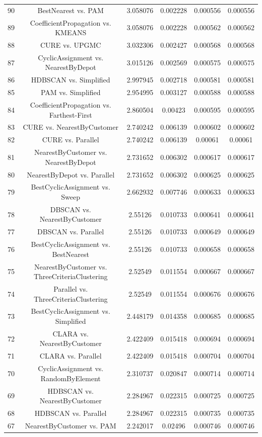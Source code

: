 \documentclass[a4paper,10pt]{article}
\begin{document}
\begin{landscape}
\begin{table}[!htp]
\begin{tabular}{cccccc}
90&BestNearest vs. PAM&3.058076&0.002228&0.000556&0.000556\\
89&CoefficientPropagation vs. KMEANS&3.058076&0.002228&0.000562&0.000562\\
88&CURE vs. UPGMC&3.032306&0.002427&0.000568&0.000568\\
87&CyclicAssignment vs. NearestByDepot&3.015126&0.002569&0.000575&0.000575\\
86&HDBSCAN vs. Simplified&2.997945&0.002718&0.000581&0.000581\\
85&PAM vs. Simplified&2.954995&0.003127&0.000588&0.000588\\
84&CoefficientPropagation vs. Farthest-First&2.860504&0.00423&0.000595&0.000595\\
83&CURE vs. NearestByCustomer&2.740242&0.006139&0.000602&0.000602\\
82&CURE vs. Parallel&2.740242&0.006139&0.00061&0.00061\\
81&NearestByCustomer vs. NearestByDepot&2.731652&0.006302&0.000617&0.000617\\
80&NearestByDepot vs. Parallel&2.731652&0.006302&0.000625&0.000625\\
79&BestCyclicAssignment vs. Sweep&2.662932&0.007746&0.000633&0.000633\\
78&DBSCAN vs. NearestByCustomer&2.55126&0.010733&0.000641&0.000641\\
77&DBSCAN vs. Parallel&2.55126&0.010733&0.000649&0.000649\\
76&BestCyclicAssignment vs. BestNearest&2.55126&0.010733&0.000658&0.000658\\
75&NearestByCustomer vs. ThreeCriteriaClustering&2.52549&0.011554&0.000667&0.000667\\
74&Parallel vs. ThreeCriteriaClustering&2.52549&0.011554&0.000676&0.000676\\
73&BestCyclicAssignment vs. Simplified&2.448179&0.014358&0.000685&0.000685\\
72&CLARA vs. NearestByCustomer&2.422409&0.015418&0.000694&0.000694\\
71&CLARA vs. Parallel&2.422409&0.015418&0.000704&0.000704\\
70&CyclicAssignment vs. RandomByElement&2.310737&0.020847&0.000714&0.000714\\
69&HDBSCAN vs. NearestByCustomer&2.284967&0.022315&0.000725&0.000725\\
68&HDBSCAN vs. Parallel&2.284967&0.022315&0.000735&0.000735\\
67&NearestByCustomer vs. PAM&2.242017&0.02496&0.000746&0.000746\\

\end{tabular}
\end{table}
\end{landscape}
\end{document}
